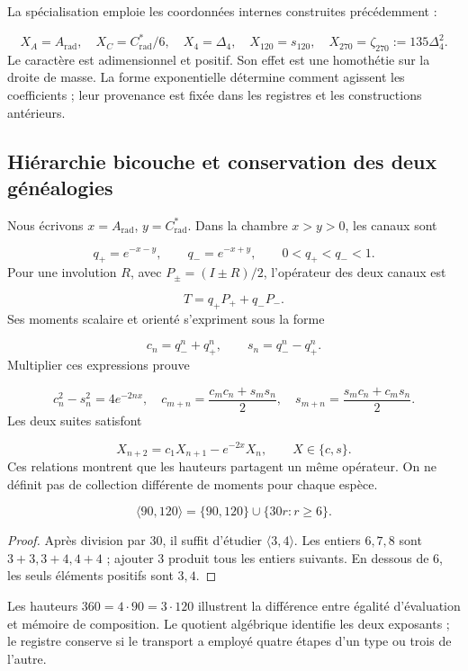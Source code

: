 La spécialisation emploie les coordonnées internes construites précédemment :

\[
 X_A=A_{\mathrm{rad}},\quad X_C=C^*_{\mathrm{rad}}/6,
 \quad X_4=\Delta_4,\quad X_{120}=s_{120},\quad
 X_{270}=\zeta_{270}:=135\Delta_4^2.
\]
Le caractère est adimensionnel et positif. Son effet est une homothétie sur
la droite de masse. La forme exponentielle détermine comment agissent les
coefficients ; leur provenance est fixée dans les registres et les constructions
antérieurs.


\subsection{Hiérarchie bicouche et conservation des deux généalogies
}

Nous écrivons \(x=A_{\mathrm{rad}}\), \(y=C^*_{\mathrm{rad}}\). Dans la
chambre \(x>y>0\), les canaux sont

\[
 q_+=e^{-x-y},\qquad q_-=e^{-x+y},\qquad0<q_+<q_-<1.
\]
Pour une involution \(R\), avec \(P_\pm=(I\pm R)/2\), l’opérateur
des deux canaux est

\[
 T=q_+P_++q_-P_-.
\]
Ses moments scalaire et orienté s’expriment sous la forme

\[
 c_n=q_-^n+q_+^n,\qquad s_n=q_-^n-q_+^n.
\]
Multiplier ces expressions prouve

\[
 c_n^2-s_n^2=4e^{-2nx},\quad
 c_{m+n}=\frac{c_mc_n+s_ms_n}{2},\quad
 s_{m+n}=\frac{s_mc_n+c_ms_n}{2}.
\]
Les deux suites satisfont

\[
 X_{n+2}=c_1X_{n+1}-e^{-2x}X_n,\qquad X\in\{c,s\}.
\]
Ces relations montrent que les hauteurs partagent un même opérateur.
On ne définit pas de collection différente de moments pour chaque espèce.


\begin{proposition}
\[
 \langle90,120\rangle=\{90,120\}\cup\{30r:r\ge6\}.
\]
\end{proposition}
\begin{proof}
Après division par \(30\), il suffit d’étudier \(\langle3,4\rangle\).
Les entiers \(6,7,8\) sont \(3+3,3+4,4+4\) ; ajouter \(3\) produit
tous les entiers suivants. En dessous de \(6\), les seuls
éléments positifs sont \(3,4\).

\end{proof}

Les hauteurs \(360=4\cdot90=3\cdot120\) illustrent la différence entre
égalité d’évaluation et mémoire de composition. Le quotient algébrique
identifie les deux exposants ; le registre conserve si le transport
a employé quatre étapes d’un type ou trois de l’autre.


